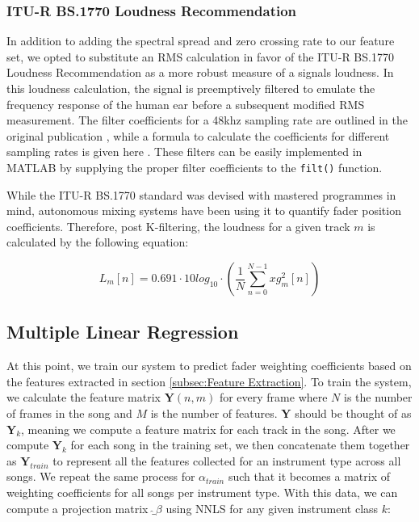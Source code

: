\documentclass{article}
\begin{document}
\subsubsection{ITU-R BS.1770 Loudness Recommendation}
In addition to adding the spectral spread and zero crossing rate to our feature set, we opted to substitute an RMS calculation in favor of the ITU-R BS.1770 Loudness Recommendation as a more robust measure of a signals loudness.  In this loudness calculation, the signal is preemptively filtered to emulate the frequency response of the human ear before a subsequent modified RMS measurement.  The filter coefficients for a 48khz sampling rate are outlined in the original publication \cite{rec2006bs}, while a formula to calculate the coefficients for different sampling rates is given here \cite{mansbridge2012implementation}.  These filters can be easily implemented in MATLAB by supplying the proper filter coefficients to the \texttt{filt()} function. 

While the ITU-R BS.1770 standard was devised with mastered programmes in mind, autonomous mixing systems have been using it to quantify fader position coefficients.  Therefore, post K-filtering, the loudness for a given track $m$ is calculated by the following equation:

\begin{equation}
\label{eq:ITU-R BS.1770}
L_m[n] = 0.691 \cdot 10log_{10} \cdot \left(\frac{1}{N}\sum_{n=0}^{N-1}xg_m^2[n]\right)
\end{equation}

\subsection{Multiple Linear Regression}
\label{subsec:Multiple Linear Regression}

At this point, we train our system to predict fader weighting coefficients based on the features extracted in section \ref{subsec:Feature Extraction}.  To train the system, we calculate the feature matrix $\bm{Y}(n, m)$ for every frame where $N$ is the number of frames in the song and $M$ is the number of features.  $\bm{Y}$ should be thought of as $\bm{Y}_k$, meaning we compute a feature matrix for each track in the song.  After we compute $\bm{Y}_k$ for each song in the training set, we then concatenate them together as $\bm{Y} _{train}$ to represent all the features collected for an instrument type across all songs.  We repeat the same process for $\alpha_{train}$ such that it becomes a matrix of weighting coefficients for all songs per instrument type.  With this data, we can compute a projection matrix $\hat_{\beta}$ using NNLS for any given instrument class $k$:
\end{document}
